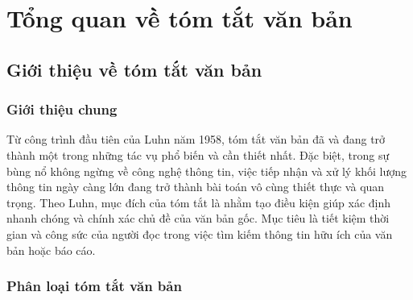 \chapter{Tổng quan về tóm tắt văn bản}
\label{Chapter2}

\section{Giới thiệu về tóm tắt văn bản}
\subsection{Giới thiệu chung}
Từ công trình đầu tiên của Luhn năm 1958, tóm tắt văn bản đã và đang trở thành một trong những tác vụ phổ biến và cần thiết nhất. Đặc biệt, trong sự bùng nổ không ngừng về công nghệ thông tin, việc tiếp nhận và xử lý khối lượng thông tin ngày càng lớn đang trở thành bài toán vô cùng thiết thực và quan trọng. Theo Luhn, mục đích của tóm tắt là nhằm tạo điều kiện giúp xác định nhanh chóng và chính xác chủ đề của văn bản gốc. Mục tiêu là tiết kiệm thời gian và công sức của người đọc trong việc tìm kiếm thông tin hữu ích của văn bản hoặc báo cáo. 


\subsection{Phân loại tóm tắt văn bản}


